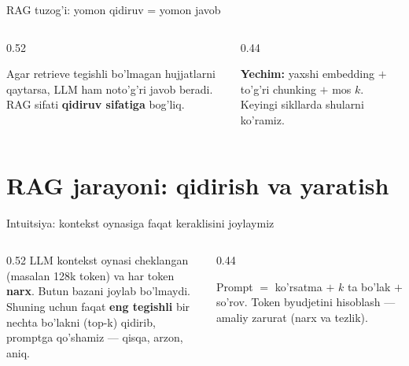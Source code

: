 \documentclass[aspectratio=169,11pt]{beamer}
\begin{document}
\begin{frame}{RAG tuzog'i: yomon qidiruv = yomon javob}
  \begin{columns}[T]
    \begin{column}{0.52\textwidth}
      \begin{tcolorbox}[warnbox,title={Garbage in, garbage out}]
        \small
        Agar retrieve tegishli bo'lmagan hujjatlarni qaytarsa, LLM ham
        noto'g'ri javob beradi. RAG sifati \textbf{qidiruv sifatiga} bog'liq.
      \end{tcolorbox}
    \end{column}
    \begin{column}{0.44\textwidth}
      \begin{tcolorbox}[okbox,top=2pt,bottom=2pt]
        \footnotesize
        \textbf{Yechim:} yaxshi embedding $+$ to'g'ri chunking $+$ mos $k$.
        Keyingi sikllarda shularni ko'ramiz.
      \end{tcolorbox}
    \end{column}
  \end{columns}
\end{frame}

\section[RAG jarayoni]{RAG jarayoni: qidirish va yaratish}

\begin{frame}{Intuitsiya: kontekst oynasiga faqat keraklisini joylaymiz}
  \begin{columns}[T]
    \begin{column}{0.52\textwidth}
      \small
      LLM kontekst oynasi cheklangan (masalan 128k token) va har token
      \textbf{narx}. Butun bazani joylab bo'lmaydi.\\[5pt]
      Shuning uchun faqat \textbf{eng tegishli} bir nechta bo'lakni (top-k)
      qidirib, promptga qo'shamiz --- qisqa, arzon, aniq.
    \end{column}
    \begin{column}{0.44\textwidth}
      \begin{tcolorbox}[okbox,top=2pt,bottom=2pt]
        \footnotesize
        Prompt $=$ ko'rsatma $+$ $k$ ta bo'lak $+$ so'rov. Token byudjetini
        hisoblash --- amaliy zarurat (narx va tezlik).
      \end{tcolorbox}
    \end{column}
  \end{columns}
\end{frame}
\end{document}
